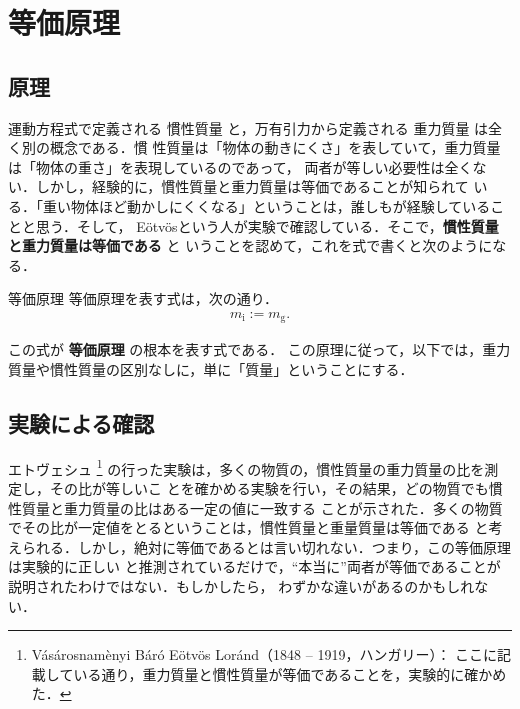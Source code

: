     \section{等価原理}
        \subsection{原理}
        運動方程式で定義される 慣性質量 と，万有引力から定義される 重力質量 は全く別の概念である．慣
        性質量は「物体の動きにくさ」を表していて，重力質量は「物体の重さ」を表現しているのであって，
        両者が等しい必要性は全くない．しかし，経験的に，慣性質量と重力質量は等価であることが知られて
        いる．「重い物体ほど動かしにくくなる」ということは，誰しもが経験していることと思う．そして，
        E\"{o}tv\"{o}sという人が実験で確認している．そこで，\textbf{慣性質量と重力質量は等価である} と
        いうことを認めて，これを式で書くと次のようになる．
                \begin{myshadebox}{等価原理}
                    等価原理を表す式は，次の通り．
                    \begin{align}
                        m_{\mathrm{i}} := m_{\mathrm{g}}.
                    \end{align}
                \end{myshadebox}

        この式が \textbf{等価原理} の根本を表す式である．
        この原理に従って，以下では，重力質量や慣性質量の区別なしに，単に「質量」ということにする．

        \subsection{実験による確認}
            エトヴェシュ
                \footnote{
                    V\'{a}s\'{a}rosnam\`{e}nyi B\'{a}r\'{o} E\"{o}tv\"{o}s Lor\'{a}nd（1848 -- 1919，ハンガリー）：
                    ここに記載している通り，重力質量と慣性質量が等価であることを，実験的に確かめた．
                }
            の行った実験は，多くの物質の，慣性質量の重力質量の比を測定し，その比が等しいこ
            とを確かめる実験を行い，その結果，どの物質でも慣性質量と重力質量の比はある一定の値に一致する
            ことが示された．多くの物質でその比が一定値をとるということは，慣性質量と重量質量は等価である
            と考えられる．しかし，絶対に等価であるとは言い切れない．つまり，この等価原理は実験的に正しい
            と推測されているだけで，“本当に”両者が等価であることが説明されたわけではない．もしかしたら，
            わずかな違いがあるのかもしれない．

